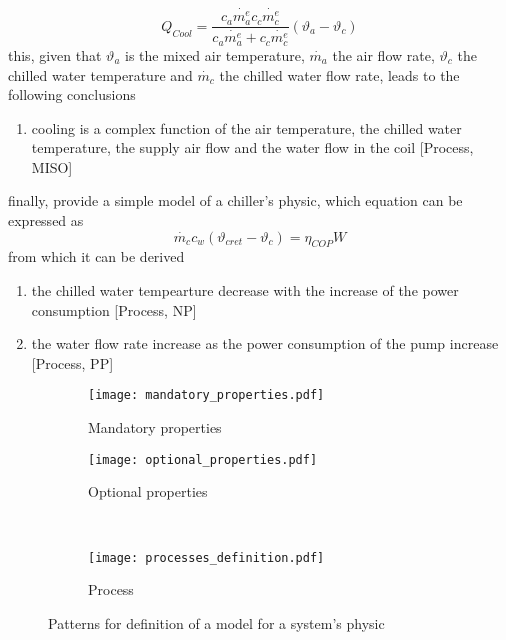 \begin{equation}
  Q_{Cool}=\frac{c_a\dot{m_{a}^{e}}c_c\dot{m_{c}^{e}}}{c_{a}\dot{m_{a}^{e}}+c_c\dot{m_{c}^{e}}}(\vartheta_{a}-\vartheta_{c}) \label{eq:cooling_load}
\end{equation}
this, given that $\vartheta_a$ is the mixed air temperature, $\dot{m_a}$ the air flow rate, $\vartheta_c$ the chilled water temperature and $\dot{m_c}$ the chilled water flow rate, leads to the following conclusions
\begin{enumerate}
  \item cooling is a complex function of the air temperature, the chilled water temperature, the supply air flow and the water flow in the coil [Process, MISO]
\end{enumerate}
finally, \textcite{building_chiller_physics} provide a simple model of a chiller's physic, which equation can be expressed as
\begin{equation}
  \dot{m_c}c_w(\vartheta_{cret}-\vartheta_c)=\eta_{COP}W
\end{equation}
from which it can be derived
\begin{enumerate}
  \item the chilled water tempearture decrease with the increase of the power consumption [Process, NP]
  \item the water flow rate increase as the power consumption of the pump increase [Process, PP]
\end{enumerate}
\begin{figure}
  \begin{subfigure}[b]{.6\textwidth}
    \centering
      \texttt{[image: mandatory\_properties.pdf]}
      \caption{Mandatory properties}
      \label{fig:mandatory_properties}
  \end{subfigure}
  \begin{subfigure}[b]{.4\textwidth}
    \centering
      \texttt{[image: optional\_properties.pdf]}
      \caption{Optional properties}
      \label{fig:optional_properties}
  \end{subfigure}
  ~
  \centering
  \begin{subfigure}[b]{.5\textwidth}
    \centering
      \texttt{[image: processes\_definition.pdf]}
      \caption{Process}
      \label{fig:processes_definition}
  \end{subfigure}
  \caption{Patterns for definition of a model for a system's physic}
  \label{fig:physic_model}
\end{figure}
